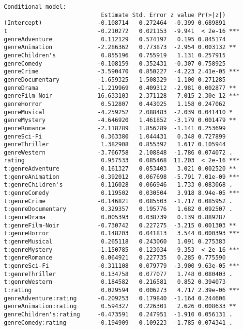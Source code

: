 \begin{verbatim}
Conditional model:
                            Estimate Std. Error z value Pr(>|z|)
(Intercept)                -0.108714   0.272464  -0.399 0.689891
t                          -0.210272   0.021153  -9.941  < 2e-16 ***
genreAdventure              0.112129   0.574197   0.195 0.845174
genreAnimation             -2.286362   0.773873  -2.954 0.003132 **
genreChildren's             0.855196   0.755919   1.131 0.257915
genreComedy                -0.108159   0.352431  -0.307 0.758925
genreCrime                 -3.590470   0.850227  -4.223 2.41e-05 ***
genreDocumentary           -1.659325   1.508329  -1.100 0.271285
genreDrama                 -1.219969   0.409312  -2.981 0.002877 **
genreFilm-Noir            -16.633103   2.371128  -7.015 2.30e-12 ***
genreHorror                 0.512807   0.443025   1.158 0.247062
genreMusical               -4.259252   2.088483  -2.039 0.041410 *
genreMystery               -4.646920   1.461852  -3.179 0.001479 **
genreRomance               -2.118789   1.856289  -1.141 0.253699
genreSci-Fi                 0.363380   1.044431   0.348 0.727899
genreThriller               1.382908   0.855392   1.617 0.105944
genreWestern               -3.766758   2.108848  -1.786 0.074072 .
rating                      0.957533   0.085468  11.203  < 2e-16 ***
t:genreAdventure            0.161327   0.053403   3.021 0.002520 **
t:genreAnimation           -0.392012   0.067698  -5.791 7.01e-09 ***
t:genreChildren's           0.116028   0.066946   1.733 0.083068 .
t:genreComedy               0.119502   0.030504   3.918 8.94e-05 ***
t:genreCrime               -0.146821   0.085503  -1.717 0.085952 .
t:genreDocumentary          0.329357   0.195776   1.682 0.092507 .
t:genreDrama                0.005393   0.038739   0.139 0.889287
t:genreFilm-Noir           -0.730742   0.227275  -3.215 0.001303 **
t:genreHorror               0.148203   0.041813   3.544 0.000393 ***
t:genreMusical              0.265118   0.243060   1.091 0.275383
t:genreMystery             -1.150785   0.123034  -9.353  < 2e-16 ***
t:genreRomance              0.064921   0.227735   0.285 0.775590
t:genreSci-Fi              -0.311108   0.079779  -3.900 9.63e-05 ***
t:genreThriller             0.134758   0.077077   1.748 0.080403 .
t:genreWestern              0.184582   0.216581   0.852 0.394073
t:rating                    0.029594   0.006273   4.717 2.39e-06 ***
genreAdventure:rating      -0.209253   0.179840  -1.164 0.244606
genreAnimation:rating       0.594327   0.226301   2.626 0.008633 **
genreChildren's:rating     -0.473591   0.247951  -1.910 0.056131 .
genreComedy:rating         -0.194909   0.109223  -1.785 0.074341 .

\end{verbatim}
